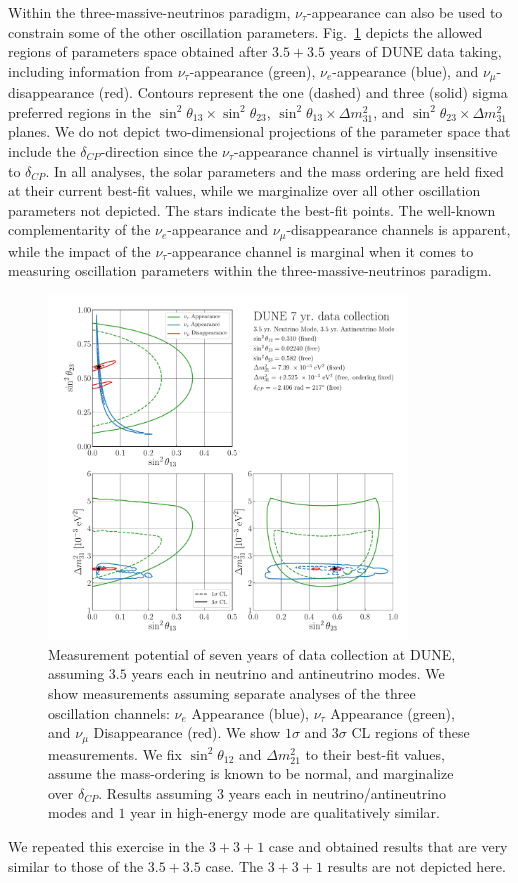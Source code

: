 \documentclass[aps,prd,onecolumn,nofootinbib,superscriptaddress, 11pt]{revtex4}
\begin{document}
Within the three-massive-neutrinos paradigm, $\nu_{\tau}$-appearance can also be used to constrain some of the other oscillation parameters. Fig.~\ref{fig:three-flavors} depicts the allowed regions of parameters space obtained after $3.5+3.5$ years of DUNE data taking, including information from $\nu_{\tau}$-appearance (green), $\nu_{e}$-appearance (blue), and $\nu_{\mu}$-disappearance (red). Contours represent the one (dashed) and three (solid) sigma preferred regions in the $\sin^2\theta_{13}\times \sin^2\theta_{23}$, $\sin^2\theta_{13}\times \Delta m^2_{31}$, and $\sin^2\theta_{23}\times \Delta m^2_{31}$ planes. We do not depict two-dimensional projections of the parameter space that include the $\delta_{CP}$-direction since the $\nu_{\tau}$-appearance channel is virtually insensitive to $\delta_{CP}$. In all analyses, the solar parameters and the mass ordering are held fixed at their current best-fit values, while we marginalize over all other oscillation parameters not depicted. The stars indicate the best-fit points. The well-known complementarity of the $\nu_{e}$-appearance and $\nu_{\mu}$-disappearance channels is apparent, while the impact of the $\nu_{\tau}$-appearance channel is marginal when it comes to measuring oscillation parameters within the three-massive-neutrinos paradigm.
\begin{figure}[ht]
\centering
\includegraphics[width=0.85\textwidth]{IndependentChannels.pdf}
\caption{Measurement potential of seven years of data collection at DUNE, assuming $3.5$ years each in neutrino and antineutrino modes. We show measurements assuming separate analyses of the three oscillation channels: $\nu_e$ Appearance (blue), $\nu_\tau$ Appearance (green), and $\nu_\mu$ Disappearance (red). We show $1\sigma$ and $3\sigma$ CL regions of these measurements. We fix $\sin^2\theta_{12}$ and $\Delta m_{21}^2$ to their best-fit values, assume the mass-ordering is known to be normal, and marginalize over $\delta_{CP}$. Results assuming $3$ years each in neutrino/antineutrino modes and $1$ year in high-energy mode are qualitatively similar.}
\label{fig:three-flavors}
\end{figure}
We repeated this exercise in the $3+3+1$ case and obtained results that are very similar to those of the $3.5+3.5$ case. The $3+3+1$ results are not depicted here. 
\end{document}
